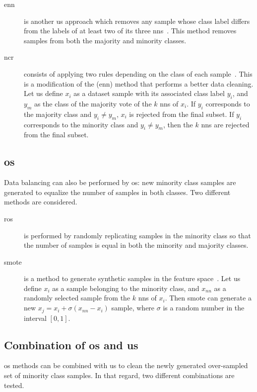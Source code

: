 \begin{description}
  \item[\Ac{enn}] is another \ac{us} approach which removes any sample whose class label differs from the labels of at least two of its three \ac{nn}s~\cite{wilson1972asymptotic}.
This method removes samples from both the majority and minority classes.      
  \item[\Ac{ncr}] consists of applying two rules depending on the class of each sample~\cite{laurikkala2001improving}.
This is a modification of the (\ac{enn}) method that performs a better data cleaning.
Let us define $x_i$ as a dataset sample with its associated class label $y_i$, and $y_m$ as the class of the majority vote of the $k$ \ac{nn}s of $x_i$.
If $y_i$ corresponds to the majority class and $y_i \neq y_m$, $x_i$ is rejected from the final subset.
If $y_i$ corresponds to the minority class and $y_i \neq y_m$, then the $k$ \ac{nn}s are rejected from the final subset.
	
\end{description}

\subsection{\acl{os}}
Data balancing can also be performed by \ac{os}: new minority class samples are generated to equalize the number of samples in both classes.
Two different methods are considered.

\begin{description}
\item[\Ac{ros}] is performed by randomly replicating samples in the minority class so that the number of samples is equal in both the minority and majority classes.
\item[\Ac{smote}] is a method to generate synthetic samples in the feature space~\cite{chawla2002smote}.
Let us define $x_i$ as a sample belonging to the minority class, and $x_{nn}$ as a randomly selected sample from the $k$ \ac{nn}s of $x_i$.
Then \ac{smote} can generate a new $x_j = x_i + \sigma \left( x_{nn} - x_i \right)$ sample, where $\sigma$ is a random number in the interval $\left[0,1\right]$.

\end{description}

\subsection{Combination of \ac{os} and \ac{us}}

\ac{os} methods can be combined with \ac{us} to clean the newly generated over-sampled set of minority class samples.
In that regard, two different combinations are tested.

